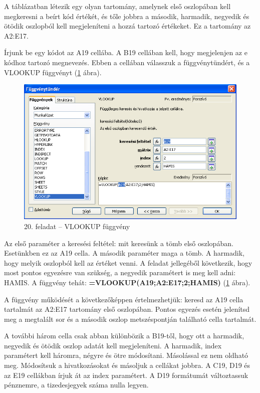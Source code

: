 A táblázatban létezik egy olyan tartomány, amelynek első
oszlopában kell megkeresni a beírt kód értékét, és
tőle jobbra a második, harmadik, negyedik és ötödik
oszlopból kell megjeleníteni a hozzá tartozó értékeket. Ez
a tartomány az A2:E17.

Írjunk be egy kódot az A19 cellába. A B19 cellában kell, hogy
megjelenjen az e kódhoz tartozó megnevezés. Ebben a cellában
válasszuk a függvénytündért, és a VLOOKUP függvényt
(\ref{20-feladatVLOOKUP} ábra).

\begin{figure}[!h]
\begin{center}
\includegraphics[width=15.999cm]{oocalcv1-img95.png}
\caption{20. feladat -- VLOOKUP függvény}\label{20-feladatVLOOKUP}
\end{center}
\end{figure}

Az első paraméter a keresési feltétel: mit keresünk a tömb
első oszlopában. Esetünkben ez az A19 cella. A második
paraméter maga a tömb. A harmadik, hogy melyik oszlopból kell az
értéket venni. A feladat jellegéből következik, hogy most
pontos egyezésre van szükség, a negyedik paramétert is meg kell
adni: HAMIS. A függvény tehát:
\textsf{\textbf{=VLOOKUP(A19;A2:E17;2;HAMIS)}} (\ref{20-feladatVLOOKUP}
ábra).

A függvény működését a következőképpen
értelmezhetjük: keresd az A19 cella tartalmát az A2:E17
tartomány első oszlopában. Pontos egyezés esetén
jelenítsd meg a megtalált sor és a második oszlop
metszéspontján található cella tartalmát.

A további három cella csak abban különbözik a B19-től,
hogy ott a harmadik, negyedik és ötödik oszlop adatát kell
megjeleníteni. A harmadik, index paramétert kell háromra,
négyre és ötre módosítani. Másolással ez nem oldható
meg. Módosítsuk a hivatkozásokat és másoljuk a cellákat
jobbra. A C19, D19 és az E19 cellákban írjuk át az index
paramétert. A D19 formátumát változtassuk pénznemre, a
tizedesjegyek száma nulla legyen.

